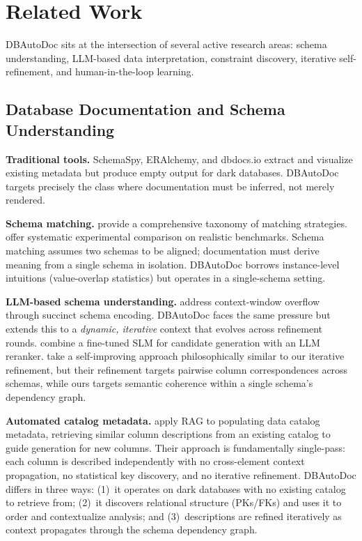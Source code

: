 \documentclass[sigconf, nonacm]{acmart}
\begin{document}
\section{Related Work}\label{sec:related}

DBAutoDoc sits at the intersection of several active research areas: schema understanding, LLM-based data interpretation, constraint discovery, iterative self-refinement, and human-in-the-loop learning.

\subsection{Database Documentation and Schema Understanding}

\textbf{Traditional tools.} SchemaSpy, ERAlchemy, and dbdocs.io extract and visualize existing metadata but produce empty output for dark databases. DBAutoDoc targets precisely the class where documentation must be inferred, not merely rendered.

\textbf{Schema matching.} \cite{rahm2001survey} provide a comprehensive taxonomy of matching strategies. \cite{koutras2021valentine} offer systematic experimental comparison on realistic benchmarks. Schema matching assumes two schemas to be aligned; documentation must derive meaning from a single schema in isolation. DBAutoDoc borrows instance-level intuitions (value-overlap statistics) but operates in a single-schema setting.

\textbf{LLM-based schema understanding.} \cite{trummer2024succinct} address context-window overflow through succinct schema encoding. DBAutoDoc faces the same pressure but extends this to a \emph{dynamic, iterative} context that evolves across refinement rounds. \cite{liu2025magneto} combine a fine-tuned SLM for candidate generation with an LLM reranker. \cite{seedat2024matchmaker} take a self-improving approach philosophically similar to our iterative refinement, but their refinement targets pairwise column correspondences across schemas, while ours targets semantic coherence within a single schema's dependency graph.

\textbf{Automated catalog metadata.} \cite{ragleveraging2025} apply RAG to populating data catalog metadata, retrieving similar column descriptions from an existing catalog to guide generation for new columns. Their approach is fundamentally single-pass: each column is described independently with no cross-element context propagation, no statistical key discovery, and no iterative refinement. DBAutoDoc differs in three ways: (1)~it operates on dark databases with no existing catalog to retrieve from; (2)~it discovers relational structure (PKs/FKs) and uses it to order and contextualize analysis; and (3)~descriptions are refined iteratively as context propagates through the schema dependency graph.
\end{document}
